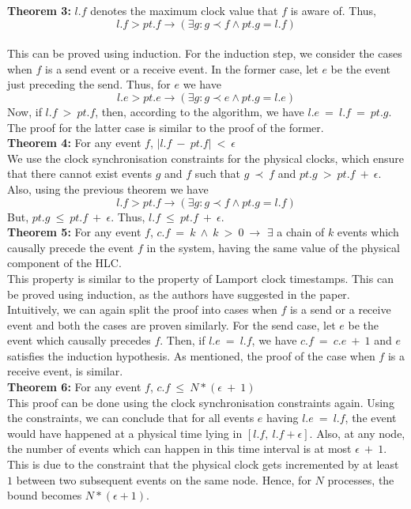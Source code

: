 \documentclass{article}
\begin{document}
    \noindent \textbf{Theorem 3:} $l.f$ denotes the maximum clock value that $f$ is aware of. Thus, $$l.f > pt.f \rightarrow (\exists g: g \prec f \land pt.g = l.f)$$ \\

    This can be proved using induction. For the induction step, we consider the cases when $f$ is a send event or a receive event. In the former case, let $e$ be the event just preceding the send. Thus, for $e$ we have $$l.e > pt.e \rightarrow (\exists g: g \prec e \land pt.g = l.e)$$ Now, if $l.f\ >\ pt.f$, then, according to the algorithm, we have $l.e\ =\ l.f\ =\ pt.g$. The proof for the latter case is similar to the proof of the former. \\

    \noindent \textbf{Theorem 4:} For any event $f$, $|l.f\ -\ pt.f|\ <\ \epsilon$ \\

    We use the clock synchronisation constraints for the physical clocks, which ensure that there cannot exist events $g$ and $f$ such that $g\ \prec\ f$ and $pt.g\ >\ pt.f\ +\ \epsilon$. Also, using the previous theorem we have $$l.f > pt.f \rightarrow (\exists g: g \prec f \land pt.g = l.f)$$ But, $pt.g\ \leq\ pt.f\ +\ \epsilon$. Thus, $l.f\ \leq\ pt.f\ +\ \epsilon$. \\

    \noindent \textbf{Theorem 5:} For any event $f$, $c.f\ =\ k\ \land\ k\ >\ 0\ \rightarrow$ $\exists$ a chain of $k$ events which causally precede the event $f$ in the system, having the same value of the physical component of the HLC. \\

    This property is similar to the property of Lamport clock timestamps. This can be proved using induction, as the authors have suggested in the paper. Intuitively, we can again split the proof into cases when $f$ is a send or a receive event and both the cases are proven similarly. For the send case, let $e$ be the event which causally precedes $f$. Then, if $l.e\ =\ l.f$, we have $c.f\ =\ c.e\ +\ 1$ and $e$ satisfies the induction hypothesis. As mentioned, the proof of the case when $f$ is a receive event, is similar. \\

    \noindent \textbf{Theorem 6:} For any event $f$, $c.f\ \leq\ N*(\epsilon\ +\ 1)$ \\

    This proof can be done using the clock synchronisation constraints again. Using the constraints, we can conclude that for all events $e$ having $l.e\ =\ l.f$, the event would have happened at a physical time lying in $[l.f,\ l.f+\epsilon]$. Also, at any node, the number of events which can happen in this time interval is at most $\epsilon\ +\ 1$. This is due to the constraint that the physical clock gets incremented by at least $1$ between two subsequent events on the same node. Hence, for $N$ processes, the bound becomes $N*(\epsilon+1)$. \\
\end{document}
